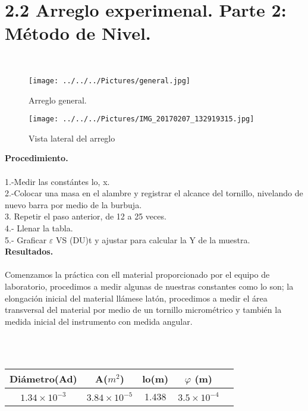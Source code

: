 \documentclass[10pt,a4paper]{article}
\begin{document}
\section*{2.2 Arreglo experimenal. Parte 2: M\'{e}todo de Nivel.} \\

\begin{figure}[hbtp]
\centering
\texttt{[image: ../../../Pictures/general.jpg]} 
\caption{Arreglo general.}
\end{figure}

\begin{figure}[hbtp]
\centering
\texttt{[image: ../../../Pictures/IMG\_20170207\_132919315.jpg]} 
\caption{Vista lateral del arreglo}
\end{figure}

\pagebreak 

\textbf{Procedimiento.}\\
\\
1.-Medir las const\'{a}ntes lo, x.\\
2.-Colocar una masa en el alambre y registrar el alcance del tornillo, nivelando de nuevo barra por medio de la burbuja.\\
3. Repetir el paso anterior, de 12 a 25 veces.\\
4.- Llenar la tabla.\\
5.- Graficar $\varepsilon$ VS (DU)t y ajustar para calcular la Y de la muestra.\\

\textbf{Resultados.}\\
\\
Comenzamos la pr\'{a}ctica con ell material proporcionado por el equipo de laboratorio, procedimos a medir algunas de nuestras constantes como lo son; la elongaci\'{o}n inicial del material ll\'{a}mese lat\'{o}n, procedimos a medir el \'{a}rea transversal del material por medio de un tornillo microm\'{e}trico y tambi\'{e}n la medida inicial del instrumento con medida angular. \\
\medskip
\\
\medskip
\medskip
\caption{Tabla 1.} 
\\
\begin{tabular}{|c|c|c|c|c|}
\hline 
Di\'{a}metro(Ad) & A(${ m }^{ 2 }$) & lo(m)& $\varphi$ (m)\\ 
\hline 
${ 1.34\times 10 }^{ -3 }$ & ${ 3.84\times 10 }^{ -5 }$ & 1.438 & ${ 3.5\times 10 }^{ -4 }$ \\
\hline 
\end{tabular}\\
\end{document}
